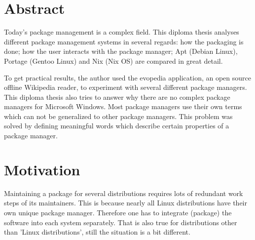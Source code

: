 \documentclass[a4paper,10pt]{article}
\begin{document}
\newpage
\section*{Abstract}
Today's package management is a complex field. This diploma thesis analyses different package management systems in several regards: how the packaging is done; how the user interacts with the package manager; Apt (Debian Linux), Portage (Gentoo Linux) and Nix (Nix OS) are compared in great detail. 

To get practical results, the author used the evopedia application, an open source offline Wikipedia reader, to experiment with several different package managers. This diploma thesis also tries to answer why there are no complex package managers for Microsoft Windows. Most package managers use their own terms which can not be generalized to other package managers. This problem was solved by defining meaningful words which describe certain properties of a package manager.  

\newpage
\section{Motivation}
\label{motivation}
Maintaining a package for several distributions requires lots of redundant work steps of its maintainers. This is because nearly all Linux distributions have their own unique package manager. Therefore one has to integrate (package) the software into each system separately. That is also true for distributions other than 'Linux distributions', still the situation is a bit different. \\
\end{document}

